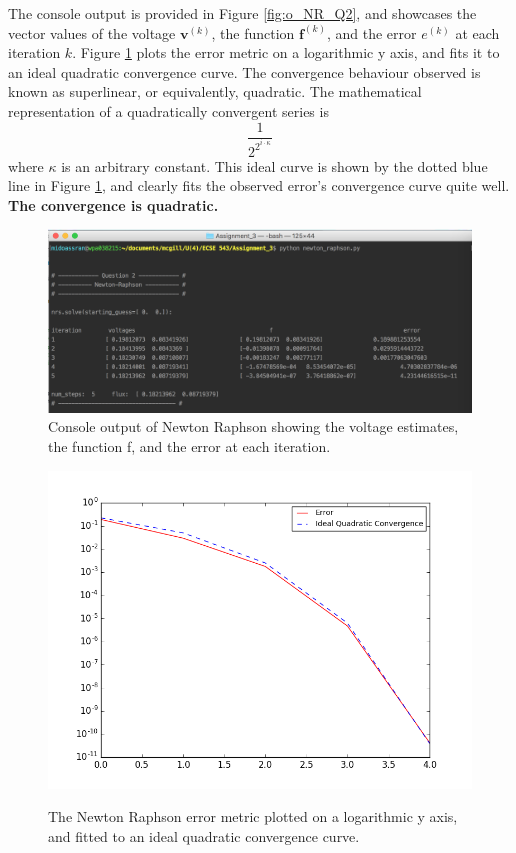 \documentclass[11pt]{article}
\begin{document}
The console output is provided in Figure \ref{fig:o_NR_Q2}, and showcases the vector values of the voltage $\mathbf{v}^{(k)}$, the function $\mathbf{f}^{(k)}$, and the error $e^{(k)}$ at each iteration $k$. Figure \ref{fig:NR_Q2} plots the error metric on a logarithmic y axis, and fits it to an ideal quadratic convergence curve. The convergence behaviour observed is known as superlinear, or equivalently, quadratic. The mathematical representation of a quadratically convergent series is
$$\frac{1}{2^{2^{i \cdot \kappa}}}$$
where $\kappa$ is an arbitrary constant. This ideal curve is shown by the dotted blue line in Figure \ref{fig:NR_Q2}, and clearly fits the observed error's convergence curve quite well. \textbf{The convergence is quadratic.}
\begin{figure}[!hbp]
	\begin{center}
		\begin{minipage}{ \textwidth}
			\includegraphics[width= \textwidth]{o_NR_Q2.png}\\
			\caption{\label{fig:o_NR_Q2}Console output of Newton Raphson showing the voltage estimates, the function f, and the error at each iteration.}
		\end{minipage}
		\begin{minipage}{ \textwidth}
			\includegraphics[width=\textwidth]{NR_Q2}\\
			\caption{\label{fig:NR_Q2}The Newton Raphson error metric plotted on a logarithmic y axis, and fitted to an ideal quadratic convergence curve.}
		\end{minipage}
	\end{center}
\end{figure}
\end{document}
